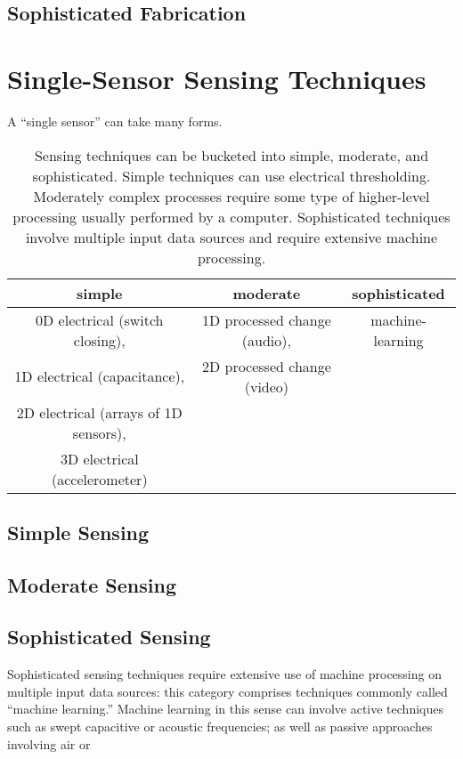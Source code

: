 \subsection{Sophisticated Fabrication}

\section{Single-Sensor Sensing Techniques}

A ``single sensor'' can take many forms. 

\begin{table}
\begin{center}
\begin{tabular}{|c|c|c|}
\hline
\textbf{simple} & \textbf{moderate} & \textbf{sophisticated} \\
\hline
0D electrical (switch closing), & 1D processed change (audio), & machine-learning \\
1D electrical (capacitance), & 2D processed change (video) & \\
2D electrical (arrays of 1D sensors), & & \\
3D electrical (accelerometer) & & \\
\hline
\end{tabular}
\end{center}
\caption{Sensing techniques can be bucketed into simple, moderate, and sophisticated. Simple techniques can use electrical thresholding. Moderately complex processes require some type of higher-level processing usually performed by a computer. Sophisticated techniques involve multiple input data sources and require extensive machine processing.}
\label{table:sensing}
\end{table}

\subsection{Simple Sensing}

\subsection{Moderate Sensing}

\subsection{Sophisticated Sensing}

Sophisticated sensing techniques require extensive use of machine processing on multiple input data sources: this category comprises techniques commonly called ``machine learning.'' Machine learning in this sense can involve active techniques such as swept capacitive \cite{sato-touche} or acoustic \cite{ono-touchandactivate,laput-acoustruments} frequencies; as well as passive approaches involving air \cite{squeezapulse?} or 
